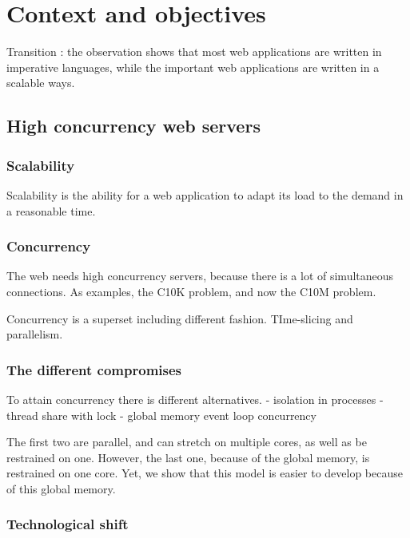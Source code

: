 \chapter{Context and objectives}
\minitoc
\eject



Transition : the observation shows that most web applications are written in imperative languages, while the important web applications are written in a scalable ways.

\section{High concurrency web servers}

\subsection{Scalability}

Scalability is the ability for a web application to adapt its load to the demand in a reasonable time.

\subsection{Concurrency}

The web needs high concurrency servers, because there is a lot of simultaneous connections.
As examples, the C10K problem, and now the C10M problem.


Concurrency is a superset including different fashion.
TIme-slicing and parallelism.

\subsection{The different compromises}

To attain concurrency there is different alternatives.
- isolation in processes 
- thread share with lock
- global memory event loop concurrency

The first two are parallel, and can stretch on multiple cores, as well as be restrained on one.
However, the last one, because of the global memory, is restrained on one core.
Yet, we show that this model is easier to develop because of this global memory.

\subsection{Technological shift}

